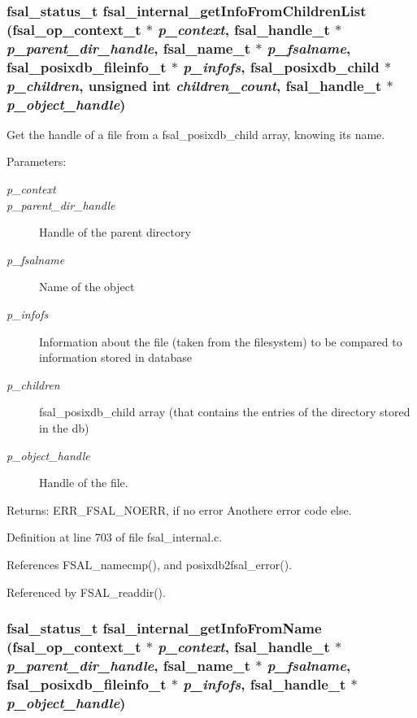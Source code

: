 \subsubsection{\setlength{\rightskip}{0pt plus 5cm}fsal\_\-status\_\-t fsal\_\-internal\_\-get\-Info\-From\-Children\-List (fsal\_\-op\_\-context\_\-t $\ast$ {\em p\_\-context}, fsal\_\-handle\_\-t $\ast$ {\em p\_\-parent\_\-dir\_\-handle}, fsal\_\-name\_\-t $\ast$ {\em p\_\-fsalname}, fsal\_\-posixdb\_\-fileinfo\_\-t $\ast$ {\em p\_\-infofs}, fsal\_\-posixdb\_\-child $\ast$ {\em p\_\-children}, unsigned int {\em children\_\-count}, fsal\_\-handle\_\-t $\ast$ {\em p\_\-object\_\-handle})}\label{fsal__internal_8c_a25}


Get the handle of a file from a fsal\_\-posixdb\_\-child array, knowing its name. 

\begin{Desc}
\item[Parameters:]
\begin{description}
\item[{\em p\_\-context}]\item[{\em p\_\-parent\_\-dir\_\-handle}]Handle of the parent directory \item[{\em p\_\-fsalname}]Name of the object \item[{\em p\_\-infofs}]Information about the file (taken from the filesystem) to be compared to information stored in database \item[{\em p\_\-children}]fsal\_\-posixdb\_\-child array (that contains the entries of the directory stored in the db) \item[{\em p\_\-object\_\-handle}]Handle of the file.\end{description}
\end{Desc}
\begin{Desc}
\item[Returns:]ERR\_\-FSAL\_\-NOERR, if no error Anothere error code else. \end{Desc}


Definition at line 703 of file fsal\_\-internal.c.

References FSAL\_\-namecmp(), and posixdb2fsal\_\-error().

Referenced by FSAL\_\-readdir().
\subsubsection{\setlength{\rightskip}{0pt plus 5cm}fsal\_\-status\_\-t fsal\_\-internal\_\-get\-Info\-From\-Name (fsal\_\-op\_\-context\_\-t $\ast$ {\em p\_\-context}, fsal\_\-handle\_\-t $\ast$ {\em p\_\-parent\_\-dir\_\-handle}, fsal\_\-name\_\-t $\ast$ {\em p\_\-fsalname}, fsal\_\-posixdb\_\-fileinfo\_\-t $\ast$ {\em p\_\-infofs}, fsal\_\-handle\_\-t $\ast$ {\em p\_\-object\_\-handle})}\label{fsal__internal_8c_a24}


